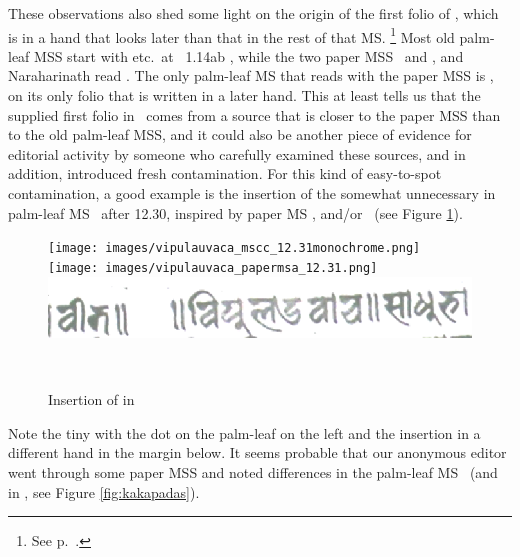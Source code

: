 \label{msCcfirstfoliokakapada}
These observations also shed some light on
the origin of the first folio of \msCc, which is in 
a hand that looks later than that in the rest of that MS.%
		\footnote{See p.~\pageref{msCcfirstfolio}.}			 
Most old palm-leaf MSS start with 
etc.\ at \VSS\ 1.14ab , while the two 
paper MSS \msPaperA\ and \msPaperC, 
and Naraharinath read . The only palm-leaf MS that reads with 
the paper MSS is \msCc, on its only folio that is
written in a later hand. This at least tells us that
the supplied first folio in \msCc\ comes from a
source that is closer to the paper MSS than to the
old palm-leaf MSS, and it could also be another piece
of evidence for editorial activity by someone who
carefully examined these sources, and in addition,
introduced fresh contamination. \label{vipulauvaca}For this kind
of easy-to-spot contamination, a good example is
the insertion of the somewhat unnecessary
 in palm-leaf MS \msCc\ after 12.30,
inspired by paper MS \msPaperA, 
and/or \msPaperC\ (see Figure \ref{fig:vipulauvaca}).
\begin{figure} 
\hfill
\texttt{[image: images/vipulauvaca\_mscc\_12.31monochrome.png]}
\hfill
\texttt{[image: images/vipulauvaca\_papermsa\_12.31.png]}
\hfill
\includegraphics[scale=.2]{images/vipulauvaca_msPaperC223v.png}
\hfill

\hspace{2em}
\msCc\ \verso
\hspace{5em}
\msPaperA\ \recto
\hspace{6em}
\msPaperC\ \verso
\hspace{3em}
\caption{Insertion of  in \msCc\label{fig:vipulauvaca}}
\end{figure}
Note the tiny  with the dot
on the palm-leaf on the left and
the insertion in a different hand in the margin below.
It seems probable that our anonymous editor
went through some paper MSS and noted differences
in the palm-leaf MS \msCc\ (and in \msNa, see Figure
\ref{fig:kakapadas}). 

\medskip

